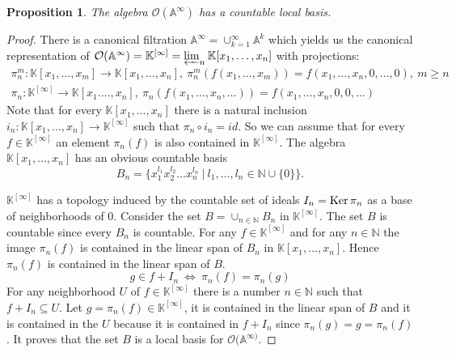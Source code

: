 \documentclass[a4paper,draft,reqno,12pt]{amsart}
\newtheorem{proposition}{Proposition}
\theoremstyle{definition}
\theoremstyle{remark}
\def\Ker{{\rm Ker}\,}
\def\BK{{\mathbb K}}
\def\BK{{\mathbb K}}
\def\BN{{\mathbb N}}
\def\BA{{\mathbb A}}
\def\CO{\mathcal{O}}
\begin{document}
\begin{proposition}\label{space}
    The algebra $\CO(\BA^{\infty})$ has a countable local basis.
\end{proposition}
\begin{proof}
    There is a canonical filtration $\BA^\infty = \cup_{k=1}^\infty \BA^k$ which yields us the canonical representation of $\mathcal{O}(\BA^\infty) = \BK^{[\infty]} = \varprojlim_{n}\BK[x_1, \dotsc, x_n]$ with projections:\begin{gather*}
        \pi_n^m:\BK[x_1,\dotsc,x_m] \to \BK[x_1, \dotsc,x_{n}], \ \pi_n^m(f(x_1, \dotsc,x_m)) = f(x_1,\dotsc,x_{n}, 0, \dotsc, 0), \ m \geq n\\
        \pi_n: \BK^{[\infty]} \to \BK[x_1.\dotsc,x_n], \ \pi_n(f(x_1, \dotsc, x_n, \dotsc)) = f(x_1,\dotsc,x_n,0,0,\dotsc)
    \end{gather*}
    Note that for every $\BK[x_1,\dotsc,x_n]$ there is a natural inclusion $i_n: \BK[x_1,\dotsc,x_n] \to \BK^{[\infty]}$ such that $\pi_n \circ i_n = id$. So we can assume that for every $f \in \BK^{[\infty]}$ an element $\pi_n(f)$ is also contained in $\BK^{[\infty]}$. The algebra $\BK[x_1,\dotsc,x_n]$ has an obvious countable basis \begin{equation*}
        B_n = \{x_1^{l_1}x_2^{l_2}\dotsc x_n^{l_n} \ | \ l_1,\dotsc,l_n \in \BN\cup\{0\}\}. 
    \end{equation*}
    
    
    $\BK^{[\infty]}$ has a topology induced by the countable set of ideals $I_n = \Ker \pi_n$ as a base of neighborhoods of 0. Consider the set $B = \cup_{n\in\BN}B_n$ in $\BK^{[\infty]}$. The set $B$ is countable since every $B_n$ is countable. For any $f \in \BK^{[\infty]}$ and for any $n \in \BN$ the image $\pi_n(f)$ is contained in the linear span of $B_n$ in $\BK[x_1,\dotsc,x_n]$. Hence $\pi_n(f)$ is contained in the linear span of $B$. \begin{equation*}
        g \in f + I_n  \ \Leftrightarrow \ \pi_n(f) = \pi_n(g)
    \end{equation*}
    For any neighborhood $U$ of $f \in \BK^{[\infty]}$ there is a number $n \in \BN$ such that $f + I_n \subseteq U$. Let $g = \pi_n(f) \in \BK^{[\infty]}$, it is contained in the linear span of $B$ and it is contained in the $U$ because it is contained in $f + I_n$ since $\pi_n(g) = g = \pi_n(f)$. It proves that the set $B$ is a local basis for $\mathcal{O}(\BA^{\infty)}$.

\end{proof}
\end{document}
